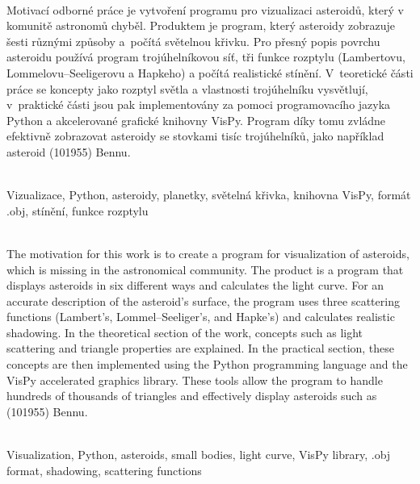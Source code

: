 \documentclass[11pt]{article}
\begin{document}
\par
\hbox{}

\newpage

\\
Motivací odborné práce je vytvoření programu pro vizualizaci asteroidů, který v komunitě astronomů chyběl. Produktem je program, který asteroidy zobrazuje šesti různými způsoby a~počítá světelnou křivku. Pro přesný popis povrchu asteroidu používá program trojúhelníkovou síť, tři funkce rozptylu (Lambertovu, Lommelovu--Seeligerovu a Hapkeho) a počítá realistické stínění. V~teore\-tické části práce se koncepty jako rozptyl světla a vlastnosti trojúhelníku vysvětlují, v~praktické části jsou pak implementovány za pomoci programovacího jazyka Python a akcelerované grafické knihovny VisPy. Program díky tomu zvládne efektivně zobrazovat asteroidy se stovkami tisíc trojúhelníků, jako například asteroid (101955) Bennu. 

\bigskip

\\
Vizualizace, Python, asteroidy, planetky, světelná křivka, knihovna VisPy, formát .obj, stínění, funkce rozptylu

\par
\hbox{}

\medskip

\\
The motivation for this work is to create a program for visualization of asteroids, which is missing in the astronomical community. The product is a program that displays asteroids in six different ways and calculates the light curve. For an accurate description of the asteroid's surface, the program uses three scattering functions (Lambert's, Lommel--Seeliger's, and Hapke's) and calculates realistic shadowing. In the theoretical section of the work, concepts such as light scattering and triangle properties are explained. In the practical section, these concepts are then implemented using the Python programming language and the VisPy accelerated graphics library. These tools allow the program to handle hundreds of thousands of triangles and effectively display asteroids such as (101955) Bennu.
\bigskip

\\
Visualization, Python, asteroids, small bodies, light curve, VisPy library, .obj format, shadowing, scattering functions

\newpage

\tableofcontents
\end{document}
